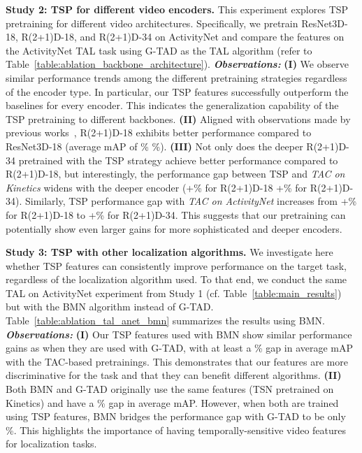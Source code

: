 \documentclass[10pt,twocolumn,letterpaper]{article}
\begin{document}
\vspace{3pt}\noindent\textbf{Study 2: TSP for different video encoders.}
This experiment explores TSP pretraining for different video architectures. Specifically, we pretrain ResNet3D-18, R(2+1)D-18, and R(2+1)D-34 on ActivityNet and compare the features on the ActivityNet TAL task using G-TAD as the TAL algorithm (refer to Table~\ref{table:ablation_backbone_architecture}).
\textit{\textbf{Observations:}}
\textbf{(I)} We observe similar performance trends among the different pretraining strategies regardless of the encoder type. In particular, our TSP features successfully outperform the baselines for every encoder. This indicates the generalization capability of the TSP pretraining to different backbones. 
\textbf{(II)} Aligned with observations made by previous works~\cite{tran2018closer}, R(2+1)D-18 exhibits better performance compared to ResNet3D-18 (average mAP of \% \vs \%). 
\textbf{(III)} Not only does the deeper R(2+1)D-34 pretrained with the TSP strategy achieve better performance compared to R(2+1)D-18, but interestingly, the performance gap between TSP and \textit{TAC on Kinetics} widens with the deeper encoder (+\% for R(2+1)D-18 \vs +\% for R(2+1)D-34). Similarly, TSP performance gap with \textit{TAC on ActivityNet} increases from +\% for R(2+1)D-18 to +\% for R(2+1)D-34. This suggests that our pretraining can potentially show even larger gains for more sophisticated and deeper encoders.


\vspace{3pt}\noindent\textbf{Study 3: TSP with other localization algorithms.}
We investigate here whether TSP features can consistently improve performance on the target task, regardless of the localization algorithm used. To that end, we conduct the same TAL on ActivityNet experiment from Study 1 (cf. Table~\ref{table:main_results}) but with the BMN algorithm instead of G-TAD. Table~\ref{table:ablation_tal_anet_bmn} summarizes the results using BMN.
\textit{\textbf{Observations:}}
\textbf{(I)} Our TSP features used with BMN show similar performance gains as when they are used with G-TAD, with at least a \% gap in average mAP with the TAC-based pretrainings. This demonstrates that our features are more discriminative for the task and that they can benefit different algorithms.
\textbf{(II)} Both BMN and G-TAD originally use the same features (TSN pretrained on Kinetics) and have a \% gap in average mAP. However, when both are trained using TSP features, BMN bridges the performance gap with G-TAD to be only \%. This highlights the importance of having temporally-sensitive video features for localization tasks.
\end{document}
